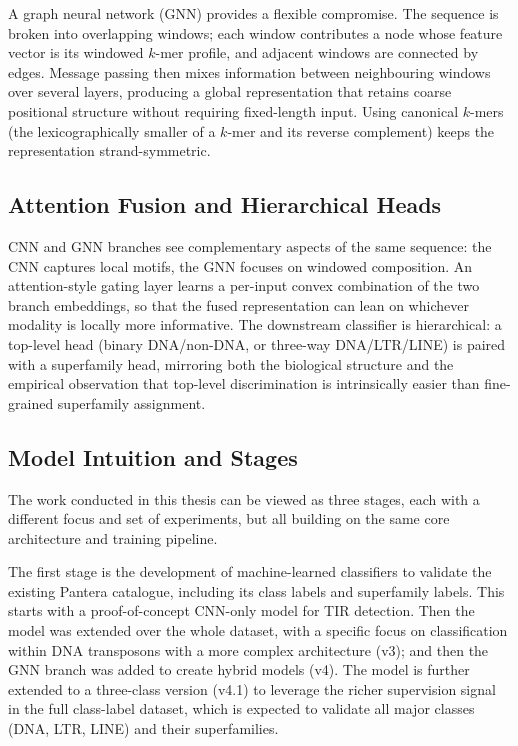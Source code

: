 \documentclass[12pt]{article}
\begin{document}
A graph neural network (GNN) \cite{kipf2016semi,hamilton2017inductive,zhou2019graph} provides a flexible compromise. The sequence is broken into overlapping windows; each window contributes a node whose feature vector is its windowed $k$-mer profile, and adjacent windows are connected by edges. Message passing then mixes information between neighbouring windows over several layers, producing a global representation that retains coarse positional structure without requiring fixed-length input. Using canonical $k$-mers (the lexicographically smaller of a $k$-mer and its reverse complement) keeps the representation strand-symmetric.

\subsection{Attention Fusion and Hierarchical Heads}

CNN and GNN branches see complementary aspects of the same sequence: the CNN captures local motifs, the GNN focuses on windowed composition. An attention-style gating layer \cite{vaswani2017attention} learns a per-input convex combination of the two branch embeddings, so that the fused representation can lean on whichever modality is locally more informative. The downstream classifier is hierarchical: a top-level head (binary DNA/non-DNA, or three-way DNA/LTR/LINE) is paired with a superfamily head, mirroring both the biological structure and the empirical observation that top-level discrimination is intrinsically easier than fine-grained superfamily assignment.

\subsection{Model Intuition and Stages}\label{ssec:model_stages}

The work conducted in this thesis can be viewed as three stages, each with a different focus and set of experiments, but all building on the same core architecture and training pipeline. 

The first stage is the development of machine-learned classifiers to validate the existing Pantera catalogue, including its class labels and superfamily labels. This starts with a proof-of-concept CNN-only model for TIR detection. Then the model was extended over the whole dataset,  with a specific focus on classification within DNA transposons with a more complex architecture (v3); and then the GNN branch was added to create hybrid models (v4). The model is further extended to a three-class version (v4.1) to leverage the richer supervision signal in the full class-label dataset, which is expected to validate all major classes (DNA, LTR, LINE) and their superfamilies. 
\end{document}
